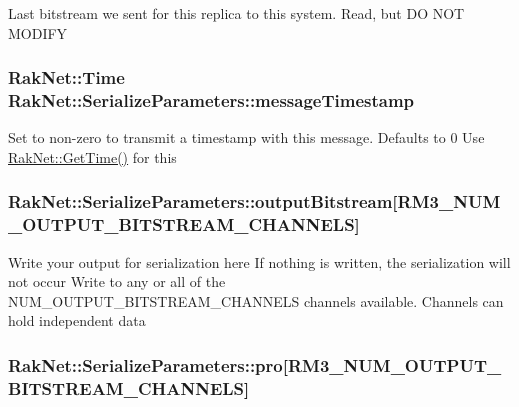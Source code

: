 Last bitstream we sent for this replica to this system. Read, but D\-O N\-O\-T M\-O\-D\-I\-F\-Y \hypertarget{struct_rak_net_1_1_serialize_parameters_aad0e0e02623bdf80d4e46b468b39a614}{
\subsubsection[{message\-Timestamp}]{\setlength{\rightskip}{0pt plus 5cm}Rak\-Net\-::\-Time Rak\-Net\-::\-Serialize\-Parameters\-::message\-Timestamp}}\label{struct_rak_net_1_1_serialize_parameters_aad0e0e02623bdf80d4e46b468b39a614}
Set to non-\/zero to transmit a timestamp with this message. Defaults to 0 Use \hyperlink{namespace_rak_net_a45ef68c020ce6b8086e7a412b5767a04}{Rak\-Net\-::\-Get\-Time()} for this \hypertarget{struct_rak_net_1_1_serialize_parameters_ad7ab99674d6452c3d5a5ea6301da4a75}{
\subsubsection[{output\-Bitstream}]{ Rak\-Net\-::\-Serialize\-Parameters\-::output\-Bitstream\mbox{[}R\-M3\-\_\-\-N\-U\-M\-\_\-\-O\-U\-T\-P\-U\-T\-\_\-\-B\-I\-T\-S\-T\-R\-E\-A\-M\-\_\-\-C\-H\-A\-N\-N\-E\-L\-S\mbox{]}}}\label{struct_rak_net_1_1_serialize_parameters_ad7ab99674d6452c3d5a5ea6301da4a75}
Write your output for serialization here If nothing is written, the serialization will not occur Write to any or all of the N\-U\-M\-\_\-\-O\-U\-T\-P\-U\-T\-\_\-\-B\-I\-T\-S\-T\-R\-E\-A\-M\-\_\-\-C\-H\-A\-N\-N\-E\-L\-S channels available. Channels can hold independent data \hypertarget{struct_rak_net_1_1_serialize_parameters_a3470c71391a99302bf89160c1c5a0c39}{
\subsubsection[{pro}]{ Rak\-Net\-::\-Serialize\-Parameters\-::pro\mbox{[}R\-M3\-\_\-\-N\-U\-M\-\_\-\-O\-U\-T\-P\-U\-T\-\_\-\-B\-I\-T\-S\-T\-R\-E\-A\-M\-\_\-\-C\-H\-A\-N\-N\-E\-L\-S\mbox{]}}}\label{struct_rak_net_1_1_serialize_parameters_a3470c71391a99302bf89160c1c5a0c39}
